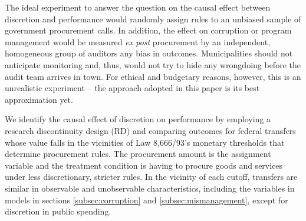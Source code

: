 \documentclass[11pt]{article}
\begin{document}
The ideal experiment to answer the question on the causal effect between discretion and performance would randomly assign rules to an unbiased sample of government procurement calls. In addition, the effect on corruption or program management would be measured \emph{ex post} procurement by an independent, homogeneous group of auditors any bias in outcomes. Municipalities should not anticipate monitoring and, thus, would not try to hide any wrongdoing before the audit team arrives in town. For ethical and budgetary reasons, however, this is an unrealistic experiment -- the approach  adopted in this paper is its best approximation yet.

We identify the causal effect of discretion on performance by employing a research discontinuity design (RD) and comparing outcomes for federal transfers whose value falls in the vicinities of Law 8,666/93's monetary thresholds that determine procurement rules. The procurement amount is the assignment variable and the treatment condition is having to procure goods and services under less discretionary, stricter rules. In the vicinity of each cutoff, transfers are similar in observable and unobservable characteristics, including the variables in models in sections \ref{subsec:corruption} and \ref{subsec:mismanagement}, except for discretion in public spending.
\end{document}
